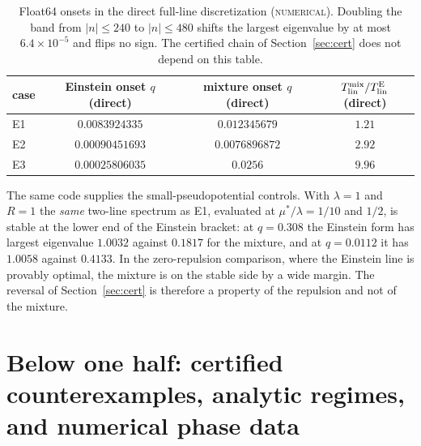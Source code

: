 \documentclass[11pt]{article}
\newcommand{\Tlin}{T_{\mathrm{lin}}}
\newcommand{\muS}{\mu^{*}}
\theoremstyle{definition}
\theoremstyle{remark}
\begin{document}
\begin{table}[t]
\centering
\footnotesize
\setlength{\tabcolsep}{6pt}
\begin{tabular}{@{}lccc@{}}
\toprule
case & Einstein onset $q$ (direct) & mixture onset $q$ (direct) & $\Tlin^{\rm mix}/\Tlin^{\rm E}$ (direct)\\
\midrule
E1 & $0.0083924335$ & $0.012345679$ & $1.21$\\
E2 & $0.00090451693$ & $0.0076896872$ & $2.92$\\
E3 & $0.00025806035$ & $0.0256$ & $9.96$\\
\bottomrule
\end{tabular}
\caption{Float64 onsets in the direct full-line discretization (\textsc{numerical}). Doubling
the band from $|n|\le240$ to $|n|\le480$ shifts the largest eigenvalue by at most
$6.4\times10^{-5}$ and flips no sign. The certified chain of Section~\ref{sec:cert} does not
depend on this table.}
\label{tab:direct}
\end{table}

The same code supplies the small-pseudopotential controls. With $\lambda=1$ and $R=1$ the
\emph{same} two-line spectrum as E1, evaluated at $\muS/\lambda=1/10$ and $1/2$, is stable
at the lower end of the Einstein bracket: at $q=0.308$ the Einstein form has largest
eigenvalue $1.0032$ against $0.1817$ for the mixture, and at $q=0.0112$ it has $1.0058$
against $0.4133$. In the zero-repulsion comparison, where the Einstein line is provably
optimal, the mixture is on the stable side by a wide margin. The reversal of
Section~\ref{sec:cert} is therefore a property of the repulsion and not of the mixture.

\section{Below one half: certified counterexamples, analytic regimes,
and numerical phase data}\label{sec:half}
\end{document}
